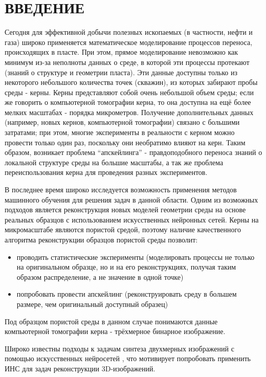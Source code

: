 \clearpage
\section*{\hfil ВВЕДЕНИЕ \hfil}
	
	Сегодня для эффективной добычи полезных ископаемых (в частности, нефти и газа) широко применяется математическое моделирование процессов переноса, происходящих в пласте. При этом, прямое моделирование невозможно как минимум из-за неполноты данных о среде, в которой эти процессы протекают (знаний о структуре и геометрии пласта). Эти данные доступны только из некоторого небольшого количества точек (скважин), из которых забирают пробы среды - керны. Керны представляют собой очень небольшой объем среды; если же говорить о компьютерной томографии керна, то она доступна на ещё более мелких масштабах - порядка микрометров. Получение дополнительных данных (например, новых кернов, компьютерной томографии) связано с большими затратами; при этом, многие эксперименты в реальности с керном можно провести только один раз, поскольку они необратимо влияют на керн. Таким образом, возникает проблема ``апскейлинга'' - правдоподобного переноса знаний о локальной структуре среды на большие масштабы, а так же проблема переиспользования керна для проведения разных экспериментов.
	
	В последнее время широко исследуется возможность применения методов машинного обучения для решения задач в данной области. Одним из возможных подходов является реконструкция новых моделей геометрии среды на основе реальных образцов с использованием искусственных нейронных сетей. Керны на микромасштабе являются пористой средой, поэтому наличие качественного алгоритма реконструкции образцов пористой среды позволит:
	
	\begin{itemize}
		\item проводить статистические эксперименты (моделировать процессы не только на оригинальном образце, но и на его реконструкциях, получая таким образом распределение, а не значение в одной точке)
		\item попробовать провести апскейлинг (реконструировать среду в большем размере, чем оригинальный доступный образец)
	\end{itemize}

	
	Под образцом пористой среды в данном случае понимаются данные компьютерной томографии керна - трёхмерное бинарное изображение.
	
	Широко известны подходы к задачам синтеза двухмерных изображений с помощью искусственных нейросетей \cite{Gatys, Ulyanov}, что мотивирует попробовать применить ИНС для задач реконструкции 3D-изображений.
	
